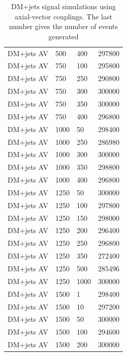 \begin{table}[]
\begin{tabular}{llll}
DM+jets  AV & 500  & 400  &297800 \\
DM+jets  AV & 750  & 100  &295800 \\
DM+jets  AV & 750  & 250  &290800 \\
DM+jets  AV & 750  & 300  &300000 \\
DM+jets  AV & 750  & 350  &300000 \\
DM+jets  AV & 750  & 400  &296800 \\
DM+jets  AV & 1000 & 50   &298400 \\
DM+jets  AV & 1000 & 250  &286980 \\
DM+jets  AV & 1000 & 300  &300000 \\
DM+jets  AV & 1000 & 350  &298800 \\
DM+jets  AV & 1000 & 400  &296800 \\
DM+jets  AV & 1250 & 50   &300000 \\
DM+jets  AV & 1250 & 100  &297800 \\
DM+jets  AV & 1250 & 150  &298000 \\
DM+jets  AV & 1250 & 200  &296400 \\
DM+jets  AV & 1250 & 250  &296800 \\
DM+jets  AV & 1250 & 350  &272400 \\
DM+jets  AV & 1250 & 500  &285496 \\
DM+jets  AV & 1250 & 1000 &300000 \\
DM+jets  AV & 1500 & 1    &298400 \\
DM+jets  AV & 1500 & 10   &297200 \\
DM+jets  AV & 1500 & 50   &300000 \\
DM+jets  AV & 1500 & 100  &294600 \\
DM+jets  AV & 1500 & 200  &300000\\
\hline \hline
\end{tabular}
\caption{DM+jets signal simulations using axial-vector couplings. The last number gives the number of events generated}
\label{tab:dmj_av}
\end{table}



